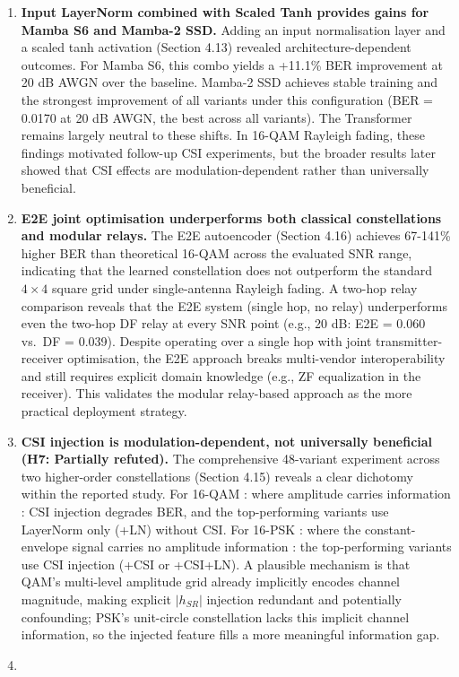 \begin{enumerate}
\item
  \textbf{Input LayerNorm combined with Scaled Tanh provides gains for Mamba S6 and Mamba-2 SSD.} Adding an input normalisation layer and a scaled tanh activation (Section 4.13) revealed architecture-dependent outcomes. For Mamba S6, this combo yields a +11.1\% BER improvement at 20 dB AWGN over the baseline. Mamba-2 SSD achieves stable training and the strongest improvement of all variants under this configuration (BER = 0.0170 at 20 dB AWGN, the best across all variants). The Transformer remains largely neutral to these shifts. In 16-QAM Rayleigh fading, these findings motivated follow-up CSI experiments, but the broader results later showed that CSI effects are modulation-dependent rather than universally beneficial.
\item
  \textbf{E2E joint optimisation underperforms both classical constellations and modular relays.} The E2E autoencoder (Section 4.16) achieves 67-141\% higher BER than theoretical 16-QAM across the evaluated SNR range, indicating that the learned constellation does not outperform the standard \(4 \times 4\) square grid under single-antenna Rayleigh fading. A two-hop relay comparison reveals that the E2E system (single hop, no relay) underperforms even the two-hop DF relay at every SNR point (e.g., 20 dB: E2E = 0.060 vs.~DF = 0.039). Despite operating over a single hop with joint transmitter-receiver optimisation, the E2E approach breaks multi-vendor interoperability and still requires explicit domain knowledge (e.g., ZF equalization in the receiver). This validates the modular relay-based approach as the more practical deployment strategy.
\item
  \textbf{CSI injection is modulation-dependent, not universally beneficial (H7: Partially refuted).} The comprehensive 48-variant experiment across two higher-order constellations (Section 4.15) reveals a clear dichotomy within the reported study. For 16-QAM : where amplitude carries information : CSI injection degrades BER, and the top-performing variants use LayerNorm only (+LN) without CSI. For 16-PSK : where the constant-envelope signal carries no amplitude information : the top-performing variants use CSI injection (+CSI or +CSI+LN). A plausible mechanism is that QAM's multi-level amplitude grid already implicitly encodes channel magnitude, making explicit \(|h_{SR}|\) injection redundant and potentially confounding; PSK's unit-circle constellation lacks this implicit channel information, so the injected feature fills a more meaningful information gap.
\item

\end{enumerate}
